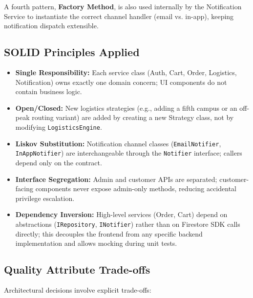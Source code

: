 \documentclass[11pt,a4paper]{article}
\begin{document}
A fourth pattern, \textbf{Factory Method}, is also used internally by the Notification Service to instantiate the correct channel handler (email vs. in-app), keeping notification dispatch extensible.
 
\subsection{SOLID Principles Applied}
\begin{itemize}
    \item \textbf{Single Responsibility:} Each service class (Auth, Cart, Order, Logistics, Notification) owns exactly one domain concern; UI components do not contain business logic.
    \item \textbf{Open/Closed:} New logistics strategies (e.g., adding a fifth campus or an off-peak routing variant) are added by creating a new Strategy class, not by modifying \texttt{LogisticsEngine}.
    \item \textbf{Liskov Substitution:} Notification channel classes (\texttt{EmailNotifier}, \texttt{InAppNotifier}) are interchangeable through the \texttt{Notifier} interface; callers depend only on the contract.
    \item \textbf{Interface Segregation:} Admin and customer APIs are separated; customer-facing components never expose admin-only methods, reducing accidental privilege escalation.
    \item \textbf{Dependency Inversion:} High-level services (Order, Cart) depend on abstractions (\texttt{IRepository}, \texttt{INotifier}) rather than on Firestore SDK calls directly; this decouples the frontend from any specific backend implementation and allows mocking during unit tests.
\end{itemize}
 
\subsection{Quality Attribute Trade-offs}
Architectural decisions involve explicit trade-offs:
 
\end{document}
